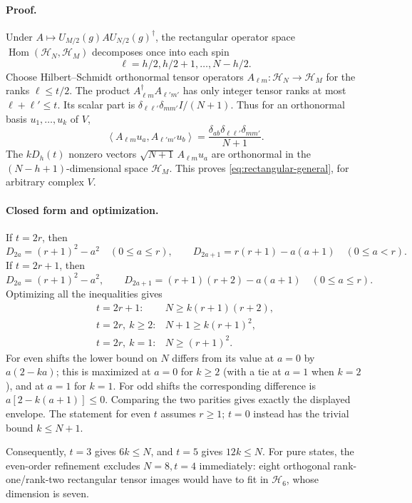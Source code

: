 \documentclass[11pt]{article}
\begin{document}
\paragraph{Proof.}
Under $A\mapsto U_{M/2}(g)AU_{N/2}(g)^\dagger$, the rectangular
operator space $\operatorname{Hom}(\mathcal H_N,\mathcal H_M)$
decomposes once into each spin
\[
 \ell=h/2,h/2+1,\ldots,N-h/2.
\]
Choose Hilbert--Schmidt orthonormal tensor operators
$A_{\ell m}:\mathcal H_N\to\mathcal H_M$ for the ranks
$\ell\le t/2$. The product
$A_{\ell m}^\dagger A_{\ell' m'}$ has only integer tensor ranks at
most $\ell+\ell'\le t$. Its scalar part is
$\delta_{\ell\ell'}\delta_{mm'}I/(N+1)$. Thus for an orthonormal
basis $u_1,\ldots,u_k$ of $V$,
\[
 \left\langle A_{\ell m}u_a,A_{\ell'm'}u_b\right\rangle
 =\frac{\delta_{ab}\delta_{\ell\ell'}\delta_{mm'}}{N+1}.
\]
The $kD_h(t)$ nonzero vectors $\sqrt{N+1}\,A_{\ell m}u_a$ are
orthonormal in the $(N-h+1)$-dimensional space $\mathcal H_M$.
This proves \eqref{eq:rectangular-general}, for arbitrary complex $V$.

\paragraph{Closed form and optimization.}
If $t=2r$, then
\[
 D_{2a}=(r+1)^2-a^2\quad(0\le a\le r),\qquad
 D_{2a+1}=r(r+1)-a(a+1)\quad(0\le a<r).
\]
If $t=2r+1$, then
\[
 D_{2a}=(r+1)^2-a^2,\qquad
 D_{2a+1}=(r+1)(r+2)-a(a+1)\quad(0\le a\le r).
\]
Optimizing all the inequalities gives
\[
 \boxed{\begin{array}{ll}
  t=2r+1:&N\ge k(r+1)(r+2),\\[2pt]
  t=2r,\ k\ge2:&N+1\ge k(r+1)^2,\\[2pt]
  t=2r,\ k=1:&N\ge(r+1)^2.
 \end{array}}
\]
For even shifts the lower bound on $N$ differs from its value at $a=0$
by $a(2-ka)$; this is maximized at $a=0$ for $k\ge2$ (with a tie
at $a=1$ when $k=2$), and at $a=1$ for $k=1$. For odd shifts the
corresponding difference is $a[2-k(a+1)]\le0$. Comparing the two
parities gives exactly the displayed envelope. The statement for even
$t$ assumes $r\ge1$; $t=0$ instead has the trivial bound $k\le N+1$.

Consequently, $t=3$ gives $6k\le N$, and $t=5$ gives $12k\le N$.
For pure states, the even-order refinement excludes $N=8,t=4$
immediately: eight orthogonal rank-one/rank-two rectangular tensor
images would have to fit in $\mathcal H_6$, whose dimension is seven.
\end{document}
